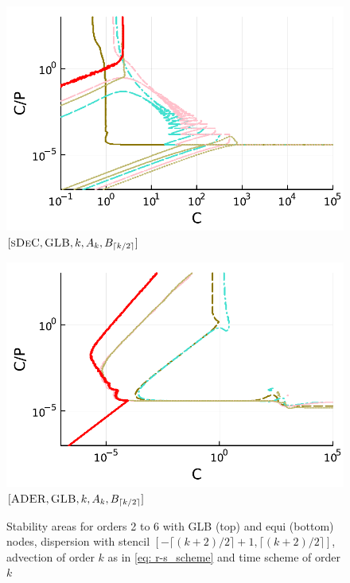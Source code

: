 \begin{figure}
\begin{minipage}[t]{0.32\textwidth}
		\centering
		\includegraphics[width=\textwidth]{pdf/pdepics/disp/IMEXDeC_subtimesteps_gaussLobatto_disp_all_2-6_newE.pdf}
		\small$[\textsc{sDeC}, \textsc{GLB},k, A_k,B_{\lceil k/2 \rceil}]$\par
	\end{minipage}
	\begin{minipage}[t]{0.32\textwidth}
		\centering
		\includegraphics[width=\textwidth]{pdf/pdepics/disp/IMEXADER_gaussLobatto_disp_all_2-6_newE.pdf}
		\small$[\textsc{ADER}, \textsc{GLB},k, A_k,B_{\lceil k/2 \rceil}]$\par
	\end{minipage}
	\caption{Stability areas for orders 2 to 6 with GLB (top) and equi (bottom) nodes, dispersion with stencil $[-\lceil (k+2)/2 \rceil +1 ,\lceil (k+2)/2\rceil]$, advection of order $k$ as in \eqref{eq: r-s_scheme} and time scheme of order $k$}
	\label{fig: disp_allall}
\end{figure}
